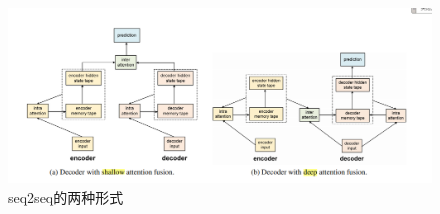 \documentclass[a4paper,UTF8]{article}
\numberwithin{equation}{section}
\begin{document}
\begin{enumerate}
    \begin{figure}[H]
        \centering
        \includegraphics[width=\textwidth]{6-3.png}
        \caption{seq2seq的两种形式}
    \end{figure}

    
\end{enumerate}
\newpage
\end{document}
